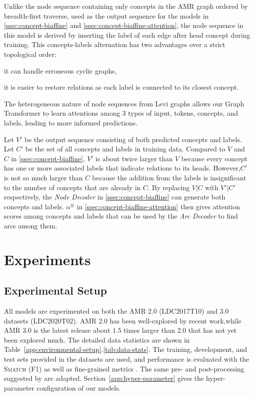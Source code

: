 \documentclass[11pt,a4paper]{article}
\newcommand{\LN}{\linebreak\noindent}    \newcommand{\textsec}[1]{\textsection\ref{#1}}
\begin{document}
Unlike the node sequence containing only concepts in the AMR graph ordered by breadth-first traverse, used as the output sequence for the models in \textsec{ssec:concept-biaffine} and \textsec{ssec:concept-biaffine-attention}, the node sequence in this model is derived by inserting the label of each edge after head concept during training. This concepts-labels alternation has two advantages over a strict topological order:
\begin{inparaenum}[(i)]
\item it can handle erroneous cyclic graphs,
\item it is easier to restore relations as each label is connected to its closest concept.
\end{inparaenum}
\noindent
The heterogeneous nature of node sequences from Levi graphs allows our Graph Transformer to learn attentions among 3 types of input, tokens, concepts, and labels, leading to more informed predictions.

Let $V'$ be the output sequence consisting of both predicted concepts and labels.
Let $C'$ be the set of all concepts and labels in training data.
Compared to $V$ and $C$ in \textsec{ssec:concept-biaffine}, $V'$ is about twice larger than $V$ because every concept has one or more associated labels that indicate relations to its heads.
However,\LN $C'$ is not so much larger than $C$ because the addition from the labels is insignificant to the number of concepts that are already in $C$. By replacing $V|C$ with $V'|C'$ respectively, the \textit{Node Decoder} in \textsec{ssec:concept-biaffine} can generate both concepts and labels.
$\alpha^\otimes$ in \textsec{ssec:concept-biaffine-attention} then gives attention scores among concepts and labels that can be used by the \textit{Arc Decoder} to find arcs among them.
 \section{Experiments}
\label{sec:experiments}

\subsection{Experimental Setup}

All models are experimented on both the AMR 2.0 (LDC2017T10) and 3.0 datasets (LDC2020T02).
AMR 2.0 has been well-explored by recent work,\LN while AMR 3.0 is the latest release about $1.5$ times larger than 2.0 that has not yet been explored much.
The detailed data statistics are shown in Table~\ref{app:environmental-setup}.\ref{tab:data-stats}.
The training, development, and test sets provided in the datasets are used, and performance is evaluated with the \textsc{Smatch} (F1) \cite{cai2013smatch} as well as fine-grained metrics \cite{damonte-etal-2017-incremental}.
The same pre- and post-processing suggested by\LN {} are adapted.
Section~\ref{app:hyper-parameter} gives the hyper-parameter configuration of our models.
\end{document}
